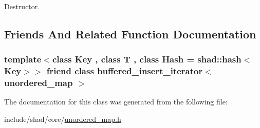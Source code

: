 Destructor. 



\subsection{Friends And Related Function Documentation}
\hypertarget{classshad_1_1unordered__map_a178983bb5902294d2c70ed8b802b4a03}{
\subsubsection[{buffered\-\_\-insert\-\_\-iterator$<$ unordered\-\_\-map $>$}]{\setlength{\rightskip}{0pt plus 5cm}template$<$class Key , class T , class Hash  = shad\-::hash$<$\-Key$>$$>$ friend class {\bf buffered\-\_\-insert\-\_\-iterator}$<$ {\bf unordered\-\_\-map} $>$\hspace{0.3cm}{\ttfamily [friend]}}}\label{classshad_1_1unordered__map_a178983bb5902294d2c70ed8b802b4a03}


The documentation for this class was generated from the following file\-:\begin{DoxyCompactItemize}
\item 
include/shad/core/\hyperlink{unordered__map_8h}{unordered\-\_\-map.\-h}\end{DoxyCompactItemize}
